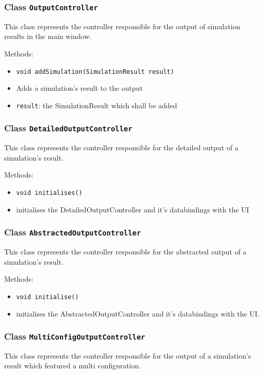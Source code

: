 \documentclass[parskip=full,11pt]{scrartcl}
\begin{document}
\subsubsection{Class \texttt{OutputController}}
This class represents the controller responsible for the output of simulation results in the main window.

Methods:
\begin{itemize}\itemsep -10pt
\item \texttt{void addSimulation(SimulationResult result)}
\item[] Adds a simulation's result to the output
\item[] \texttt{result}: the SimulationResult which shall be added

\end{itemize}

\subsubsection{Class \texttt{DetailedOutputController}}
This class represents the controller responsible for the detailed output of a simulation's result.

Methods:
\begin{itemize}\itemsep -10pt
\item \texttt{void initialises()}
\item[] initialises the DetailedOutputController and it's databindings with the UI
\end{itemize}

\subsubsection{Class \texttt{AbstractedOutputController}}
This class represents the controller responsible for the abstracted output of a simulation's result.

Methods:
\begin{itemize}\itemsep -10pt
\item \texttt{void initialise()}
\item[] initialises the AbstractedOutputController and it's databindings with the UI.
\end{itemize}

\subsubsection{Class \texttt{MultiConfigOutputController}}
This class represents the controller responsible for the output of a simulation's result which featured a multi configuration.
\end{document}
